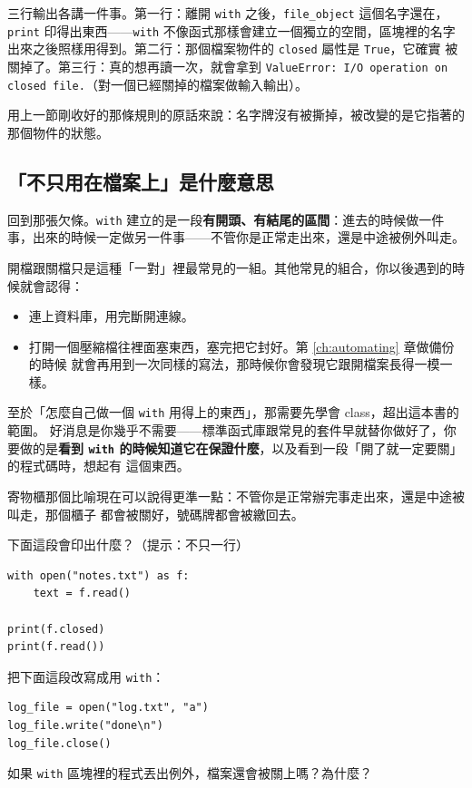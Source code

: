 三行輸出各講一件事。第一行：離開 \texttt{with} 之後，\texttt{file\_object} 這個名字還在，
\texttt{print} 印得出東西——\texttt{with} 不像函式那樣會建立一個獨立的空間，區塊裡的名字
出來之後照樣用得到。第二行：那個檔案物件的 \texttt{closed} 屬性是 \texttt{True}，它確實
被關掉了。第三行：真的想再讀一次，就會拿到
\texttt{ValueError: I/O operation on closed file.}（對一個已經關掉的檔案做輸入輸出）。

用上一節剛收好的那條規則的原話來說：名字牌沒有被撕掉，被改變的是它指著的那個物件的狀態。

\subsection*{「不只用在檔案上」是什麼意思}

回到那張欠條。\texttt{with} 建立的是一段\textbf{有開頭、有結尾的區間}：進去的時候做一件
事，出來的時候一定做另一件事——不管你是正常走出來，還是中途被例外叫走。

開檔跟關檔只是這種「一對」裡最常見的一組。其他常見的組合，你以後遇到的時候就會認得：

\begin{itemize}
\item 連上資料庫，用完斷開連線。
\item 打開一個壓縮檔往裡面塞東西，塞完把它封好。第 \ref{ch:automating} 章做備份的時候
就會再用到一次同樣的寫法，那時候你會發現它跟開檔案長得一模一樣。
\end{itemize}

至於「怎麼自己做一個 \texttt{with} 用得上的東西」，那需要先學會 class，超出這本書的範圍。
好消息是你幾乎不需要——標準函式庫跟常見的套件早就替你做好了，你要做的是\textbf{看到
\texttt{with} 的時候知道它在保證什麼}，以及看到一段「開了就一定要關」的程式碼時，想起有
這個東西。

寄物櫃那個比喻現在可以說得更準一點：不管你是正常辦完事走出來，還是中途被叫走，那個櫃子
都會被關好，號碼牌都會被繳回去。

\begin{drills}[label=drills:with-explained]
\item 下面這段會印出什麼？（提示：不只一行）
\begin{verbatim}
with open("notes.txt") as f:
    text = f.read()

print(f.closed)
print(f.read())
\end{verbatim}
\item 把下面這段改寫成用 \texttt{with}：
\begin{verbatim}
log_file = open("log.txt", "a")
log_file.write("done\n")
log_file.close()
\end{verbatim}
\item 如果 \texttt{with} 區塊裡的程式丟出例外，檔案還會被關上嗎？為什麼？
\end{drills}

